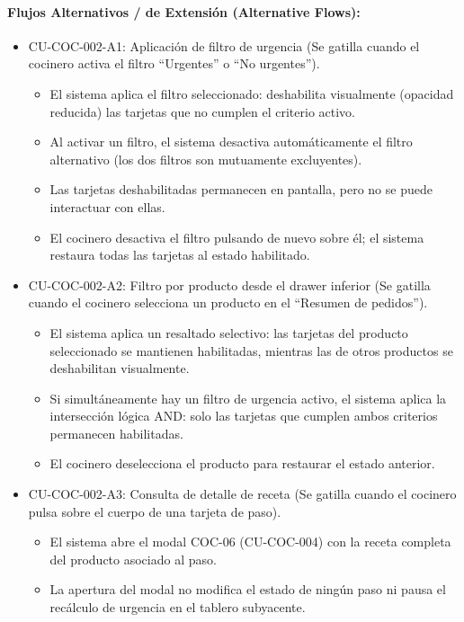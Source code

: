 \paragraph{Flujos Alternativos / de Extensión (Alternative Flows):}
\begin{itemize}
    \item CU-COC-002-A1: Aplicación de filtro de urgencia (Se gatilla cuando el cocinero activa el filtro ``Urgentes'' o ``No urgentes'').
    \begin{itemize}
        \item El sistema aplica el filtro seleccionado: deshabilita visualmente (opacidad reducida) las tarjetas que no cumplen el criterio activo.
        \item Al activar un filtro, el sistema desactiva automáticamente el filtro alternativo (los dos filtros son mutuamente excluyentes).
        \item Las tarjetas deshabilitadas permanecen en pantalla, pero no se puede interactuar con ellas.
        \item El cocinero desactiva el filtro pulsando de nuevo sobre él; el sistema restaura todas las tarjetas al estado habilitado.
    \end{itemize}
    \item CU-COC-002-A2: Filtro por producto desde el drawer inferior (Se gatilla cuando el cocinero selecciona un producto en el ``Resumen de pedidos'').
    \begin{itemize}
        \item El sistema aplica un resaltado selectivo: las tarjetas del producto seleccionado se mantienen habilitadas, mientras las de otros productos se deshabilitan visualmente.
        \item Si simultáneamente hay un filtro de urgencia activo, el sistema aplica la intersección lógica AND: solo las tarjetas que cumplen ambos criterios permanecen habilitadas.
        \item El cocinero deselecciona el producto para restaurar el estado anterior.
    \end{itemize}
    \item CU-COC-002-A3: Consulta de detalle de receta (Se gatilla cuando el cocinero pulsa sobre el cuerpo de una tarjeta de paso).
    \begin{itemize}
        \item El sistema abre el modal COC-06 (CU-COC-004) con la receta completa del producto asociado al paso.
        \item La apertura del modal no modifica el estado de ningún paso ni pausa el recálculo de urgencia en el tablero subyacente.

\end{itemize}
\end{itemize}
